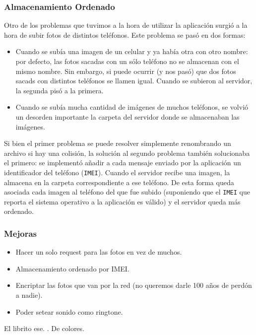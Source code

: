 \documentclass[10pt, a4paper,english,spanish]{article}
\begin{document}
\subsubsection{Almacenamiento Ordenado} %
\label{ssub:almacenamiento_ordenado}

Otro de los problemas que tuvimos a la hora de utilizar la aplicación surgió a la hora de subir fotos de distintos teléfonos. Este problema se pasó en dos formas:
\begin{itemize}
	\item Cuando se subía una imagen de un celular y ya había otra con otro nombre: por defecto, las fotos sacadas con un sólo teléfono no se almacenan con el mismo nombre. Sin embargo, si puede ocurrir (y nos pasó) que dos fotos sacads con distintos teléfonos se llamen igual. Cuando se subieron al servidor, la segunda pisó a la primera.
	\item Cuando se subía mucha cantidad de imágenes de muchos teléfonos, se volvió un desorden importante la carpeta del servidor donde se almacenaban las imágenes.
\end{itemize}

Si bien el primer problema se puede resolver simplemente renombrando un archivo si hay una colisión, la solución al segundo problema también solucionaba el primero: se implementó añadir a cada mensaje enviado por la aplicación un identificador del teléfono (\texttt{IMEI}). Cuando el servidor recibe una imagen, la almacena en la carpeta correspondiente a ese teléfono. De esta forma queda asociada cada imagen al teléfono del que fue subido (suponiendo que el \texttt{IMEI} que reporta el sistema operativo a la aplicación es válido) y el servidor queda más ordenado.



\subsubsection{Mejoras} %
\label{ssub:Mejoras}
\begin{itemize}
	\item Hacer un solo request para las fotos en vez de muchos.
	\item Almacenamiento ordenado por IMEI.
	\item Encriptar las fotos que van por la red (no queremos darle 100 años de perdón a nadie).
	\item Poder setear sonido como ringtone.
\end{itemize}



\begin{thebibliography}{8}
\raggedright

	El librito ese.
	.
	\newblock De colores.

\end{thebibliography}
\end{document}
